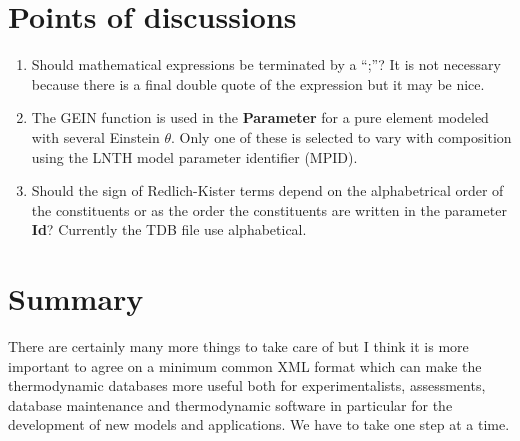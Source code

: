 \documentclass{article}
\begin{document}

\newpage 

\section{Points of discussions}

\begin{enumerate}
\item Should mathematical expressions be terminated by a ``;''?  It is
  not necessary because there is a final double quote of the expression
  but it may be nice.

\item The GEIN function is used in the {\bf Parameter} for a pure
  element modeled with several Einstein $\theta$.  Only one of these
  is selected to vary with composition using the LNTH model parameter
  identifier (MPID).

\item Should the sign of Redlich-Kister terms depend on the
  alphabetrical order of the constituents or as the order the
  constituents are written in the parameter {\bf Id}?  Currently the
  TDB file use alphabetical.

%

\end{enumerate}

\section{Summary}

There are certainly many more things to take care of but I think it is
more important to agree on a minimum common XML format which can make
the thermodynamic databases more useful both for experimentalists,
assessments, database maintenance and thermodynamic software in
particular for the development of new models and applications.  We
have to take one step at a time.
\end{document}
